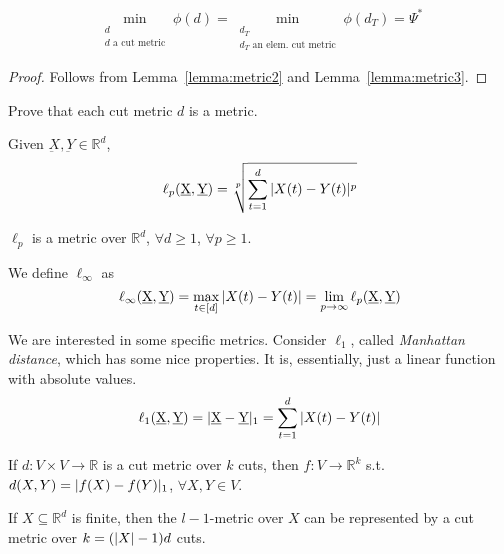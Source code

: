     \begin{corollary}
        \[ \min_{\substack{d\\ d \text{  a cut metric}}} \phi(d) = \min_{\substack{d_T\\ d_T \text{ an elem. cut metric}}} \phi(d_T) = \Psi^*  \]
    \end{corollary}

    \begin{proof}
        Follows from Lemma~\ref{lemma:metric2} and Lemma~\ref{lemma:metric3}.
    \end{proof}

    \begin{exercise}
        Prove that each cut metric $d$ is a metric.
    \end{exercise}

    \begin{definition}
        Given $\underbar{X}, \underbar{Y} \in \mathbb{R}^d$,
        \[ \ell_p(\underbar{X}, \underbar{Y}) = \sqrt[p]{\sum_{t=1}^{d} \vert X(t) - Y(t) \vert^p} \]
    \end{definition}

    \begin{theorem}
        $\ell_p$ is a metric over $\mathbb{R}^d$, $\forall d \geq 1$, $\forall p \geq 1$.
    \end{theorem}

    We define $\ell_\infty$ as
    \[ \ell_\infty(\underbar{X}, \underbar{Y}) = \max_{t \in [d]} \vert X(t) - Y(t) \vert = \lim_{p \rightarrow \infty} \ell_p(\underbar{X}, \underbar{Y}) \]

    We are interested in some specific metrics.
    Consider $\ell_1$, called \textit{Manhattan distance}, which has some nice properties.
    It is, essentially, just a linear function with absolute values.
    \[ \ell_1(\underbar{X}, \underbar{Y}) = \vert \underbar{X} - \underbar{Y} \vert_1 = \sum_{t=1}^{d} \vert X(t) - Y(t) \vert \]

    \begin{lemma}\label{lemma:metric4}
        If $d : V \times V \rightarrow \mathbb{R}$ is a cut metric over $k$ cuts, then $f : V \rightarrow \mathbb{R}^k$ s.t. $d(X,Y) = \vert f(X) - f(Y) \vert_1$, $\forall X,Y \in V$.

        If $X \subseteq \mathbb{R}^d$ is finite, then the $l-1$-metric over $X$ can be represented by a cut metric over $k = (\vert X \vert-1)d$ cuts.
    \end{lemma}

